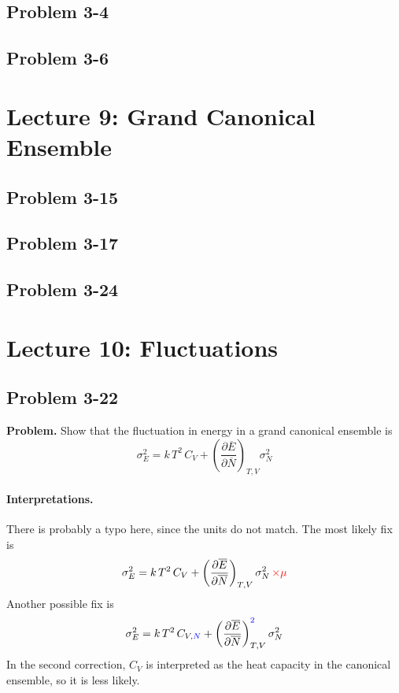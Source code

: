 \documentclass[twocolumn, 10pt]{article}
\numberwithin{equation}{section}
\newenvironment{problem}
{\par\medskip\sffamily \color{problue}
  \textbf{Problem. }\ignorespaces}
{\medskip}
\begin{document}
\subsection{Problem 3-4}

\subsection{Problem 3-6}

\section{Lecture 9: Grand Canonical Ensemble}

\subsection{Problem 3-15}

\subsection{Problem 3-17}

\subsection{Problem 3-24}

\section{Lecture 10: Fluctuations}

\subsection{Problem 3-22}

\begin{problem}
Show that the fluctuation in energy in a grand canonical ensemble is
$$
\sigma_E^2 = k \, T^2 \, C_V
  + \left( \frac{\partial \overline E } { \partial \overline N} \right)_{T, V} \sigma_N^2
$$
\end{problem}

\paragraph*{Interpretations.}

There is probably a typo here, since the units do not match.
%
The most likely fix is
\begin{equation}
  \sigma_E^2 = k \, T^2 \, C_V
  + \left( \frac{\partial \overline E }
                { \partial \overline N} \right)_{T, V}
    \sigma_N^2 \, \textcolor{red}{\times \mu}
  \label{eq:prob3-22a}
\end{equation}
%
Another possible fix is
%
\begin{equation}
  \sigma_E^2 = k \, T^2 \, C_{V,\textcolor{blue}{N}}
  + \left( \frac{\partial \overline E }
                { \partial \overline N} \right)_{T, V}^{\textcolor{blue}{2}}
    \sigma_N^2
  \label{eq:prob3-22b}
\end{equation}
%
In the second correction,
$C_V$ is interpreted as the heat capacity in the canonical ensemble,
so it is less likely.
\end{document}
